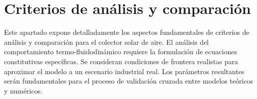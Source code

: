 \section{Criterios de análisis y comparación}
\label{sec:cap04_criterios}

Este apartado expone detalladamente los aspectos fundamentales de criterios de análisis y comparación para el colector solar de aire.
El análisis del comportamiento termo-fluidodinámico requiere la formulación de ecuaciones constitutivas específicas.
Se consideran condiciones de frontera realistas para aproximar el modelo a un escenario industrial real.
Los parámetros resultantes serán fundamentales para el proceso de validación cruzada entre modelos teóricos y numéricos.
